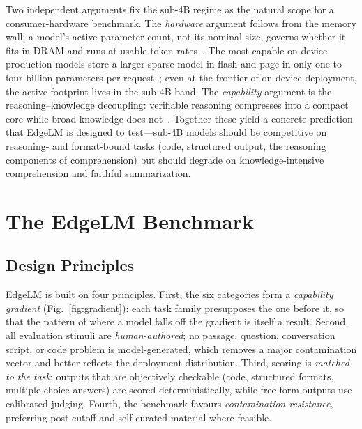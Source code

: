 \documentclass[runningheads]{llncs}
\begin{document}
Two independent arguments fix the sub-4B regime as the natural scope for a
consumer-hardware benchmark. The \emph{hardware} argument follows from the memory
wall: a model's active parameter count, not its nominal size, governs whether it
fits in DRAM and runs at usable token rates~\cite{rooflinebench2026}. The most
capable on-device production models store a larger sparse model in flash and
page in only one to four billion parameters per
request~\cite{appleafm3}; even at the frontier of on-device deployment, the
active footprint lives in the sub-4B band. The \emph{capability} argument is the
reasoning--knowledge decoupling: verifiable reasoning compresses into a compact
core while broad knowledge does not~\cite{vibethinker2026}. Together these yield
a concrete prediction that EdgeLM is designed to test---sub-4B models should be
competitive on reasoning- and format-bound tasks (code, structured output, the
reasoning components of comprehension) but should degrade on knowledge-intensive
comprehension and faithful summarization.

\section{The EdgeLM Benchmark}
\label{sec:benchmark}

\subsection{Design Principles}

EdgeLM is built on four principles. First, the six categories form a
\emph{capability gradient} (Fig.~\ref{fig:gradient}): each task family
presupposes the one before it, so that the pattern of where a model falls off
the gradient is itself a result. Second, all evaluation stimuli are
\emph{human-authored}; no passage, question, conversation script, or code
problem is model-generated, which removes a major contamination vector and
better reflects the deployment distribution. Third, scoring is \emph{matched to
the task}: outputs that are objectively checkable (code, structured formats,
multiple-choice answers) are scored deterministically, while free-form outputs
use calibrated judging. Fourth, the benchmark favours \emph{contamination
resistance}, preferring post-cutoff and self-curated material where feasible.
\end{document}
